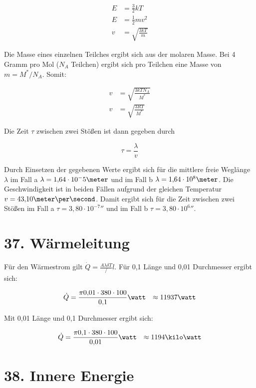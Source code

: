 \documentclass[a4paper,german,12pt,smallheadings]{scrartcl}
\begin{document}
\begin{align*}
  E &= \frac{3}{2} k T \\
  E &= \frac{1}{2} m v^2 \\
  v &= \sqrt{\frac{3 k T}{m}}
\end{align*}

Die Masse eines einzelnen Teilches ergibt sich aus der molaren Masse. Bei 4
Gramm pro Mol ($N_A$ Teilchen) ergibt sich pro Teilchen eine Masse von $m =
M^*/N_A$. Somit:

\begin{align*}
  v &= \sqrt{\frac{3 k T N_A}{M^*}} \\
  v &= \sqrt{\frac{3 RT}{M^*}}
\end{align*}

Die Zeit $\tau$ zwischen zwei Stößen ist dann gegeben durch 

\begin{equation*}
\tau = \frac{\lambda}{v}
\end{equation*}

Durch Einsetzen der gegebenen Werte ergibt sich für die mittlere freie Weglänge
$\lambda$ im Fall a $\lambda = 1{,}64 \cdot 10^-5 \meter$ und im Fall b
$\lambda = 1{,}64 \cdot 10^8 \meter$. Die Geschwindigkeit ist in beiden Fällen
aufgrund der gleichen Temperatur $v = 43{,}10 \meter\per\second$. Damit ergibt
sich für die Zeit zwischen zwei Stößen im Fall a $\tau = 3{,}80 \cdot 10^{-7}
\second$ und im Fall b $\tau =  3{,}80 \cdot 10^{6} \second$.


\section*{37. Wärmeleitung}

Für den Wärmestrom gilt $\dot Q = \frac{A \lambda \delta T}/l$. Für 0{,}1
\meter Länge und 0{,}01 \meter Durchmesser ergibt sich:

\begin{align*}
  \dot Q &= \frac{\pi 0{,}01 \cdot 380 \cdot 100}{0{,}1} \watt
         &\approx 11937 \watt
\end{align*}

Mit 0{,}01 \meter Länge und 0{,}1 \meter Durchmesser ergibt sich:

\begin{align*}
  \dot Q &= \frac{\pi 0{,}1 \cdot 380 \cdot 100}{0{,}01} \watt
         &\approx 1194 \kilo\watt
\end{align*}

\section*{38. Innere Energie}
\end{document}
